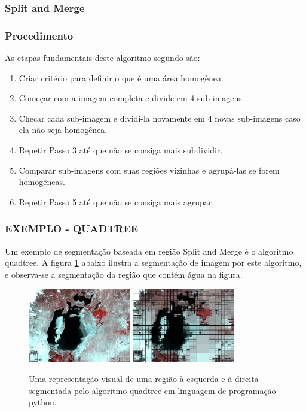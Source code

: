 \subsubsection{Split and Merge}
\subsubsection*{Procedimento}
As etapas fundamentais deste algoritmo segundo  são: 
\begin{enumerate}
    \item Criar critério para definir o que é uma área homogênea.
    \item Começar com a imagem completa e divide em 4 sub-imagens.
    \item Checar cada sub-imagem e dividi-la novamente em 4 novas sub-imagens caso ela não seja homogênea.
    \item Repetir Passo 3 até que não se consiga mais subdividir.
    \item Comparar sub-imagens com suas regiões vizinhas e agrupá-las se forem homogêneas.
    \item Repetir Passo 5 até que não se consiga mais agrupar.
\end{enumerate}

\subsubsection*{EXEMPLO - QUADTREE}
Um exemplo de segmentação baseada em região Split and Merge é o algoritmo quadtree. A figura \ref{fig:aral} abaixo ilustra a segmentação de imagem por este algoritmo, e observa-se a segmentação da região que contém água na figura.

\begin{figure}[!htb]
 \centering
 \def\baselinestretch{1}\small\normalsize
 \includegraphics[width=0.4\textwidth]{img/stf-aral1997.jpg}\qquad
 \includegraphics[width=0.4\textwidth]{img/stf-aral1997-quadtree.jpg} 
 \caption{\label{fig:aral}Uma representação visual de uma região \citep{stanford} à esquerda e à direita segmentada pelo algoritmo quadtree em linguagem de programação python.}
\end{figure}

